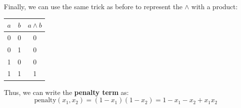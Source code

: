 \begin{examplebox}[: $x_{1} + x_{2} \ge 1$]
    Finally, we can use the same trick as before to represent the $\land$ with a product:
    \begin{center}
        \begin{tabular}{@{} c c c @{}}
            \toprule
            $a$ & $b$ & $a \land b$ \\
            \midrule
            0 & 0 & 0 \\
            0 & 1 & 0 \\
            1 & 0 & 0 \\
            1 & 1 & 1 \\
            \bottomrule
        \end{tabular}
    \end{center}
    Thus, we can write the \textbf{penalty term} as:
    \begin{equation*}
        \text{penalty}(x_1, x_2) = (1 - x_1)(1 - x_2) = 1 - x_1 - x_2 + x_1 x_2
    \end{equation*}
\end{examplebox}

